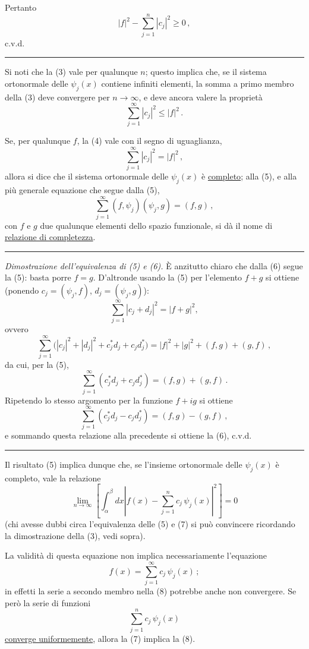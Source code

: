 \documentclass[11pt, a4paper]{book}
\numberwithin{equation}{section}
\begin{document}
Pertanto
\[
|f|^2-\sum_{j=1}^{n}|c_j|^2\geq 0\,,
\]
c.v.d.
\medskip\hrule\medskip

Si noti che la (3) vale per qualunque $n$; questo implica che, se il sistema ortonormale delle $\psi_j(x)$ contiene infiniti elementi, la somma a primo membro della (3) deve convergere per $n\to\infty$, e deve ancora valere la proprietà
\begin{equation}
\sum_{j=1}^{\infty}|c_j|^2\leq |f|^2\,.
\end{equation}

Se, per qualunque $f$, la (4) vale con il segno di uguaglianza,
\begin{equation}
\sum_{j=1}^{\infty}|c_j|^2=|f|^2\,,
\end{equation}
allora si dice che il sistema ortonormale delle $\psi_j(x)$ è \underline{completo}; alla (5), e alla più generale equazione che segue dalla (5),
\begin{equation}
\sum_{j=1}^{\infty}(f,\psi_j)(\psi_j,g)=(f,g)\,,
\end{equation}
con $f$ e $g$ due qualunque elementi dello spazio funzionale, si dà il nome di \underline{relazione di completezza}.

\hrule
\medskip
\noindent\textit{Dimostrazione dell'equivalenza di (5) e (6).} È anzitutto chiaro che dalla (6) segue la (5): basta porre $f=g$. D'altronde usando la (5) per l'elemento $f+g$ si ottiene (ponendo $c_j=(\psi_j,f)$, $d_j=(\psi_j,g)$):
\[
\sum_{j=1}^{\infty}|c_j+d_j|^2=|f+g|^2,
\]
ovvero
\[
\sum_{j=1}^{\infty}\bigl(|c_j|^2+|d_j|^2+c_j^*d_j+c_j d_j^*\bigr)
=|f|^2+|g|^2+(f,g)+(g,f)\,,
\]
da cui, per la (5),
\[
\sum_{j=1}^{\infty}(c_j^*d_j+c_jd_j^*)=(f,g)+(g,f)\,.
\]
Ripetendo lo stesso argomento per la funzione $f+ig$ si ottiene
\[
\sum_{j=1}^{\infty}(c_j^*d_j-c_jd_j^*)=(f,g)-(g,f)\,,
\]
e sommando questa relazione alla precedente si ottiene la (6), c.v.d.
\medskip\hrule\medskip

Il risultato (5) implica dunque che, se l'insieme ortonormale delle $\psi_j(x)$ è completo, vale la relazione
\begin{equation}
\lim_{n\to\infty}\left[\int_\alpha^\beta dx\left|f(x)-\sum_{j=1}^{n}c_j\,\psi_j(x)\right|^2\right]=0
\end{equation}
(chi avesse dubbi circa l'equivalenza delle (5) e (7) si può convincere ricordando la dimostrazione della (3), vedi sopra).

La validità di questa equazione non implica necessariamente l'equazione
\begin{equation}
f(x)=\sum_{j=1}^{\infty}c_j\,\psi_j(x)\,;
\end{equation}
in effetti la serie a secondo membro nella (8) potrebbe anche non convergere. Se però la serie di funzioni
\[
\sum_{j=1}^{n}c_j\,\psi_j(x)
\]
\underline{converge uniformemente}, allora la (7) implica la (8).
\end{document}
